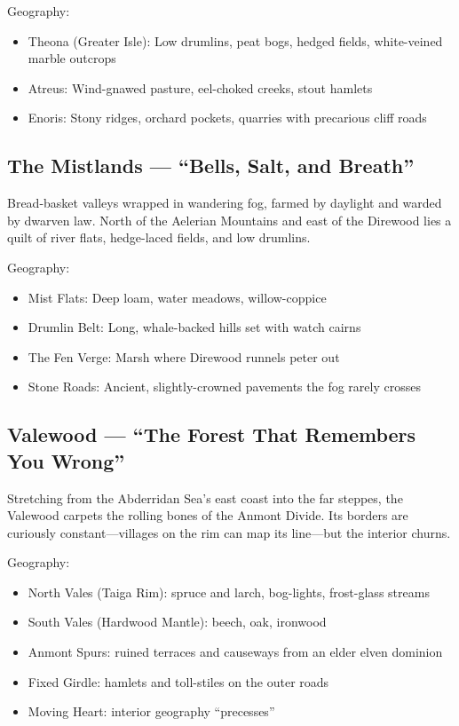 Geography:
\begin{itemize}
    \item Theona (Greater Isle): Low drumlins, peat bogs, hedged fields, white-veined marble outcrops
    \item Atreus: Wind-gnawed pasture, eel-choked creeks, stout hamlets
    \item Enoris: Stony ridges, orchard pockets, quarries with precarious cliff roads
\end{itemize}

\subsection{The Mistlands --- ``Bells, Salt, and Breath''}
\label{sec:mistlands}

Bread-basket valleys wrapped in wandering fog, farmed by daylight and warded by dwarven law. North of the Aelerian Mountains and east of the Direwood lies a quilt of river flats, hedge-laced fields, and low drumlins.

Geography:
\begin{itemize}
    \item Mist Flats: Deep loam, water meadows, willow-coppice
    \item Drumlin Belt: Long, whale-backed hills set with watch cairns
    \item The Fen Verge: Marsh where Direwood runnels peter out
    \item Stone Roads: Ancient, slightly-crowned pavements the fog rarely crosses
\end{itemize}

\subsection{Valewood --- ``The Forest That Remembers You Wrong''}
\label{sec:valewood}

Stretching from the Abderridan Sea's east coast into the far steppes, the Valewood carpets the rolling bones of the Anmont Divide. Its borders are curiously constant---villages on the rim can map its line---but the interior churns.

Geography:
\begin{itemize}
    \item North Vales (Taiga Rim): spruce and larch, bog-lights, frost-glass streams
    \item South Vales (Hardwood Mantle): beech, oak, ironwood
    \item Anmont Spurs: ruined terraces and causeways from an elder elven dominion
    \item Fixed Girdle: hamlets and toll-stiles on the outer roads
    \item Moving Heart: interior geography ``precesses''
\end{itemize}

